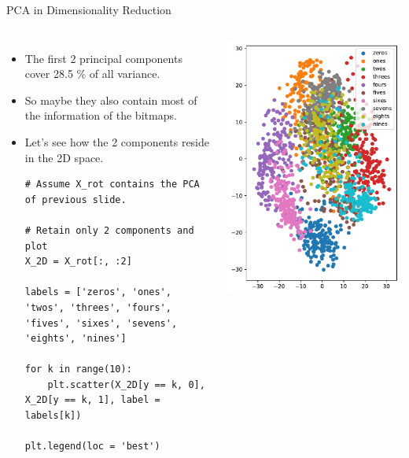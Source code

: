 \documentclass[10pt, aspectratio=169]{beamer} %
\begin{document}
\begin{frame}[fragile, allowframebreaks=0.8]{PCA in Dimensionality Reduction}
		\begin{columns}
	    \begin{itemize}
\item The first 2 principal components cover 28.5 \% of all variance.
\item So maybe they also contain most of the information of the bitmaps.
\item Let's see how the 2 components reside in the 2D space.
\begin{lstlisting}
# Assume X_rot contains the PCA of previous slide.

# Retain only 2 components and plot
X_2D = X_rot[:, :2]

labels = ['zeros', 'ones', 'twos', 'threes', 'fours', 'fives', 'sixes', 'sevens', 'eights', 'nines']

for k in range(10):
    plt.scatter(X_2D[y == k, 0], X_2D[y == k, 1], label = labels[k])

plt.legend(loc = 'best')
\end{lstlisting}

\end{itemize}
			
		\begin{center}
			\includegraphics[width=\columnwidth]{digits_pca_proj.pdf}
		\end{center}
		\end{columns}
\end{frame}
\end{document}
